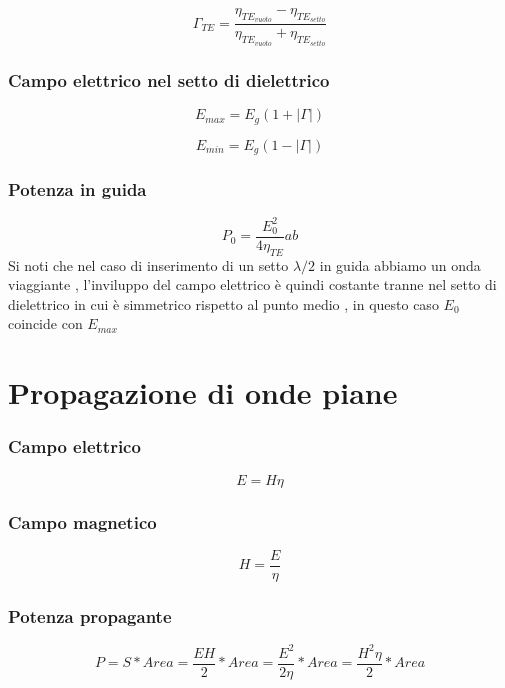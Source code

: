 \documentclass[10pt,a4paper]{report}
\begin{document}
			\[
			\Gamma_{TE}=\frac{\eta_{TE_{vuoto}}-\eta_{TE_{setto}}}{\eta_{TE_{vuoto}}+\eta_{TE_{setto}}}
			\]
		\subsection{Campo elettrico nel setto di dielettrico}
		\[
		E_{max}=E_g(1+|\Gamma|)
		\]

		\[
		E_{min}=E_g(1-|\Gamma|)
		\]


		\subsection{Potenza in guida}
				\begin{equation}
				P_0=\frac{E_0^2}{4\eta_{TE}}ab
				\end{equation}
				Si noti che nel caso di inserimento di un setto $\lambda/2$ in guida abbiamo un onda viaggiante , l'inviluppo del campo elettrico è quindi costante tranne nel setto di dielettrico in cui è simmetrico rispetto al punto medio , in questo caso $E_0$ coincide con $E_{max}$
		

\chapter{Propagazione di onde piane}

	\subsection{Campo elettrico}

		\begin{equation}
		E=H\eta
		\label{eq:campo-elettrico}
		\end{equation}
		

	\subsection{Campo magnetico}
		\begin{equation}
		H=\frac{E}{\eta}
		\label{eq:campo-magnetico}
		\end{equation}
	

	\subsection{Potenza propagante}


		\begin{equation}
		P=S*Area=\frac{EH}{2}*Area=\frac{E^2}{2\eta}*Area=\frac{H^2\eta}{2}*Area
		\label{eq:potenza-propagante}
		\end{equation}
	
\end{document}

